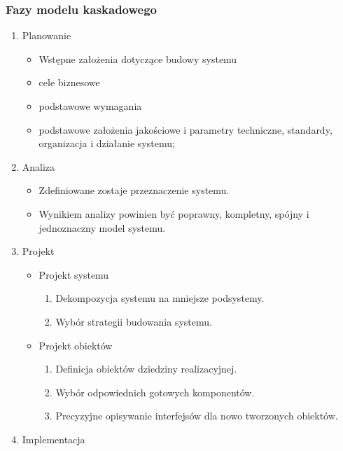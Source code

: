 \documentclass[12pt]{article}
\begin{document}
    \subsubsection{Fazy modelu kaskadowego}
    \begin{enumerate}
        \item Planowanie
        \begin{itemize}
            \item Wstępne założenia dotyczące budowy systemu
            \item cele biznesowe
            \item podstawowe wymagania
            \item podstawowe założenia jakościowe i parametry techniczne, standardy, organizacja i działanie systemu;
        \end{itemize}
        \item Analiza
            \begin{itemize}
                \item  Zdefiniowane zostaje przeznaczenie systemu.
                \item Wynikiem analizy powinien być poprawny, kompletny, spójny i jednoznaczny model systemu.
            \end{itemize}
        \item Projekt
            \begin{itemize}
                \item Projekt systemu
                \begin{enumerate}
                    \item Dekompozycja systemu na mniejsze podsystemy.
                    \item Wybór strategii budowania systemu.
                \end{enumerate}
                \item Projekt obiektów
                \begin{enumerate}
                    \item Definicja obiektów dziedziny realizacyjnej.
                    \item Wybór odpowiednich gotowych komponentów.
                    \item Precyzyjne opisywanie interfejsów dla nowo tworzonych obiektów.
                \end{enumerate}
            \end{itemize}
        \item Implementacja
            \begin{itemize}

\end{itemize}
\end{enumerate}
\end{document}
